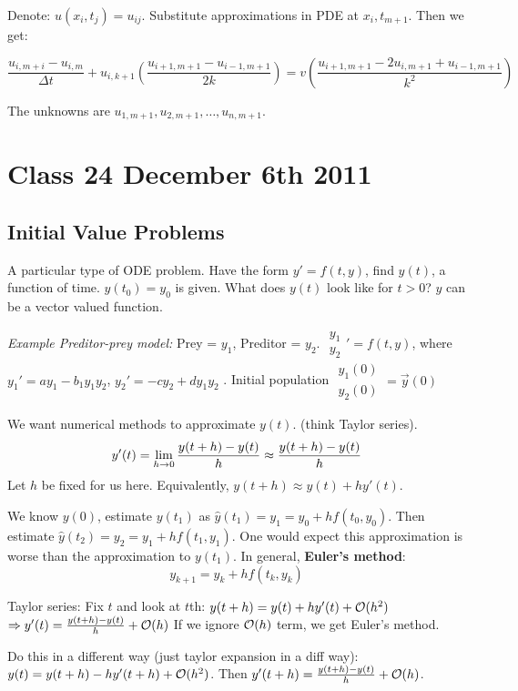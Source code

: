 Denote: $u(x_i, t_j) = u_{ij}$. Substitute approximations in PDE at
$x_i, t_{m+1}$. Then we get:

$$\frac{u_{i,m+i} - u_{i,m}}{\Delta t} +
u_{i,k+1}(\frac{u_{i+1,m+1}-u_{i-1,m+1}}{2k}) = v
  (\frac{u_{i+1,m+1}-2u_{i,m+1} +u_{i-1,m+1}}{k^2})$$

The unknowns are $u_{1,m+1}, u_{2,m+1}, \dots, u_{n,m+1}$.
\pagebreak
\section{Class 24 December 6th 2011}

\subsection{Initial Value Problems}
A particular type of ODE problem. Have the form $y' = f(t,y)$, find
$y(t)$, a function of time. $y(t_0)=y_0$ is given. What does $y(t)$
look like for $t>0$? $y$ can be a vector valued function.

\emph{Example Preditor-prey model:} Prey = $y_1$, Preditor =
$y_2$. $
\begin{smallmatrix}
  y_1\\y_2
\end{smallmatrix}' = f(t,y)$, where $y_1' = ay_1 - b_1y_1y_2$, $y_2' =-cy_2 + dy_1y_2$ .
Initial population $\begin{smallmatrix}
  y_1(0)\\y_2(0) \end{smallmatrix}  = \vec y(0)$

We want numerical methods to approximate $y(t)$. (think Taylor
series).
$$y'(t) = \lim_{h\rightarrow 0}\frac{y(t+h)-y(t)}{h}\approx
\frac{y(t+h)-y(t)}{h}$$
Let $h$ be fixed for us here.
Equivalently, $y(t+h) \approx y(t) + hy'(t)$.

We know $y(0)$, estimate $y(t_1)$ as $\hat y(t_1) = y_1 = y_0 +
hf(t_0, y_0)$. Then estimate $\hat y(t_2) = y_2 = y_1 +
hf(t_1,y_1)$. One would expect this approximation is worse than the
approximation to $y(t_1)$.
In general, \textbf{Euler's method}: $$y_{k+1} = y_k + hf(t_k,y_k)$$ 

Taylor series: Fix $t$ and look at $t$th: $y(t+h) = y(t) + hy'(t) +
\mathcal{O}(h^2)$ $\Rightarrow y'(t) = \frac{y(t+h)-y(t)}{h} + \mathcal{O}(h)$
If we ignore $\mathcal{O}(h)$ term, we get Euler's method.

Do this in a different way (just taylor expansion in a diff way):
$y(t) = y(t+h) - hy'(t+h) + \mathcal{O}(h^2)$. Then $y'(t+h) = \frac{y(t+h) -
  y(t)}{h} + \mathcal{O}(h)$.

